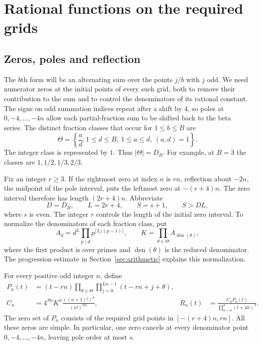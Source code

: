 \section{Rational functions on the required grids}\label{sec:construction}

\subsection{Zeros, poles and reflection}

The $b$th form will be an alternating sum over the points $j/b$ with
$j$ odd. We need numerator zeros at the initial points of every such
grid, both to remove their contribution to the sum and to control
the denominators of its rational constant. The signs on odd summation
indices repeat after a shift by $4$, so poles at $0,-4,\ldots,-4n$
allow each partial-fraction sum to be shifted back to the beta series.
The distinct fraction classes that occur for $1\le b\le B$ are
\[
 \Theta=\left\{\frac ad:1\le d\le B,\ 1\le a\le d,\ (a,d)=1\right\}.
\]
The integer class is represented by $1$. Thus $|\Theta|=D_B$.
For example, at $B=3$ the classes are $1,1/2,1/3,2/3$.

Fix an integer $r\ge3$. If the rightmost zero at index $n$ is $rn$,
reflection about $-2n$, the midpoint of the pole interval, puts the
leftmost zero at $-(r+4)n$. The zero interval therefore has length
$(2r+4)n$. Abbreviate
\[
 D=D_B,\qquad L=2r+4,\qquad S=s+1,
 \qquad S>DL,
\]
where $s$ is even. The integer $r$ controls the length of the initial
zero interval. To normalize the denominators of each fraction class,
put
\begin{equation}\label{eq:K}
 A_d=d^L\prod_{p\mid d}p^{\lceil L/(p-1)\rceil},\qquad
 K=\prod_{\theta\in\Theta}A_{\operatorname{den}(\theta)},
\end{equation}
where the first product is over primes and
$\operatorname{den}(\theta)$ is the reduced denominator. The
progression estimate in Section~\ref{sec:arithmetic} explains this
normalization.

For every positive odd integer $n$, define
\begin{align}
 P_n(t)&=(t-rn)\prod_{\theta\in\Theta}
                    \prod_{j=0}^{Ln-1}(t-rn+j+\theta),\label{eq:P}\\
 C_n&=4^{Sn}K^n\frac{((n+1)!)^S}{(n!)^{DL}},
 &R_n(t)&=\frac{C_nP_n(t)}{\prod_{h=0}^n(t+4h)^S}.
 \label{eq:R}
\end{align}
The zero set of $P_n$ consists of the required grid points in
$[-(r+4)n,rn]$. All these zeros are simple. In particular, one zero
cancels at every denominator point $0,-4,\ldots,-4n$, leaving pole
order at most $s$.

